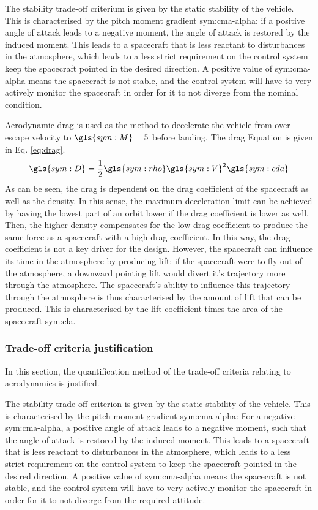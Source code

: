 The stability trade-off criterium is given by the static stability of the vehicle. This is characterised by the pitch moment gradient \gls{sym:cma-alpha}: if a positive angle of attack leads to a negative moment, the angle of attack is restored by the induced moment. This leads to a spacecraft that is less reactant to disturbances in the atmosphere, which leads to a less strict requirement on the control system keep the spacecraft pointed in the desired direction. A positive value of \gls{sym:cma-alpha} means the spacecraft is not stable, and the control system will have to very actively monitor the spacecraft in order for it to not diverge from the nominal condition.

Aerodynamic drag is used as the method to decelerate the vehicle from over escape velocity to $\gls{sym:M}=5$ before landing. The drag Equation is given in Eq. \ref{eq:drag}.
\begin{equation} \label{eq:drag}
\gls{sym:D} = \frac{1}{2}\gls{sym:rho}\gls{sym:V}^2\gls{sym:cda}
\end{equation}
As can be seen, the drag is dependent on the drag coefficient of the spacecraft as well as the density. In this sense, the maximum deceleration limit can be achieved by having the lowest part of an orbit lower if the drag coefficient is lower as well. Then, the higher density compensates for the low drag coefficient to produce the same force as a spacecraft with a high drag coefficient. In this way, the drag coefficient is not a key driver for the design. However, the spacecraft can influence its time in the atmosphere by producing lift: if the spacecraft were to fly out of the atmosphere, a downward pointing lift would divert it's trajectory more through the atmosphere. The spacecraft's ability to influence this trajectory through the atmosphere is thus characterised by the amount of lift that can be produced. This is characterised by the lift coefficient times the area of the spacecraft \gls{sym:cla}.

\subsubsection{Trade-off criteria justification} \label{sec:tradeoffaero}
In this section, the quantification method of the trade-off criteria relating to aerodynamics is justified.

The stability trade-off criterion is given by the static stability of the vehicle. This is characterised by the pitch moment gradient \gls{sym:cma-alpha}: For a negative \gls{sym:cma-alpha}, a positive angle of attack leads to a negative moment, such that the angle of attack is restored by the induced moment. This leads to a spacecraft that is less reactant to disturbances in the atmosphere, which leads to a less strict requirement on the control system to keep the spacecraft pointed in the desired direction. A positive value of \gls{sym:cma-alpha} means the spacecraft is not stable, and the control system will have to very actively monitor the spacecraft in order for it to not diverge from the required attitude. \\


